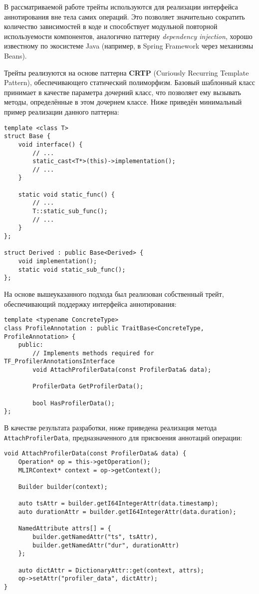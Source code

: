 В рассматриваемой работе трейты используются для реализации интерфейса аннотирования вне тела самих операций. Это позволяет значительно сократить количество зависимостей в коде и способствует модульной повторной используемости компонентов, аналогично паттерну \textit{dependency injection}, хорошо известному по экосистеме Java (например, в Spring Framework через механизмы Beans).

Трейты реализуются на основе паттерна \textbf{CRTP} (Curiously Recurring Template Pattern), обеспечивающего статический полиморфизм. Базовый шаблонный класс принимает в качестве параметра дочерний класс, что позволяет ему вызывать методы, определённые в этом дочернем классе. Ниже приведён минимальный пример реализации данного паттерна:

\begin{lstlisting}[caption={Демонстрация принципа CRTP}]
template <class T>
struct Base {
    void interface() {
        // ...
        static_cast<T*>(this)->implementation();
        // ...
    }

    static void static_func() {
        // ...
        T::static_sub_func();
        // ...
    }
};

struct Derived : public Base<Derived> {
    void implementation();
    static void static_sub_func();
};
\end{lstlisting}

На основе вышеуказанного подхода был реализован собственный трейт, обеспечивающий поддержку интерфейса аннотирования:

\begin{lstlisting}[caption={Трейт аннотирования операций MLIR}]
template <typename ConcreteType>
class ProfileAnnotation : public TraitBase<ConcreteType, ProfileAnnotation> {
    public:
        // Implements methods required for TF_ProfilerAnnotationsInterface
        void AttachProfilerData(const ProfilerData& data);

        ProfilerData GetProfilerData();

        bool HasProfilerData();
};
\end{lstlisting}

В качестве результата разработки, ниже приведена реализация метода \texttt{AttachProfilerData}, предназначенного для присвоения аннотаций операции:

\begin{lstlisting}[caption={Реализация метода AttachProfilerData}]
void AttachProfilerData(const ProfilerData& data) {
    Operation* op = this->getOperation();
    MLIRContext* context = op->getContext();

    Builder builder(context);

    auto tsAttr = builder.getI64IntegerAttr(data.timestamp);
    auto durationAttr = builder.getI64IntegerAttr(data.duration);

    NamedAttribute attrs[] = {
        builder.getNamedAttr("ts", tsAttr),
        builder.getNamedAttr("dur", durationAttr)
    };

    auto dictAttr = DictionaryAttr::get(context, attrs);
    op->setAttr("profiler_data", dictAttr);
}
\end{lstlisting}

